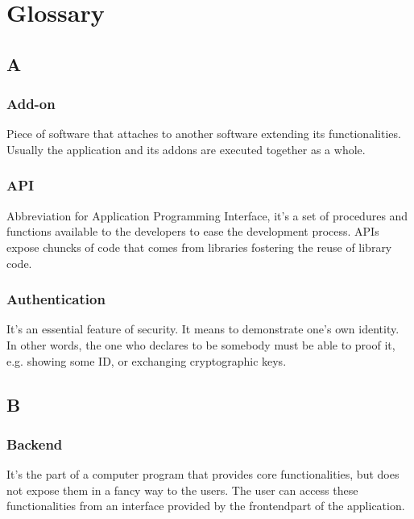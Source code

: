 \section{Glossary}

\subsection*{A}

\subsubsection*{Add-on}
Piece of software that attaches to another software extending its functionalities. Usually the application and its addons are executed together as a whole.

\subsubsection*{API}
Abbreviation for Application Programming Interface, it's a set of procedures and functions available to the developers to ease the development process. APIs expose chuncks of code that comes from libraries fostering the reuse of library code.

\subsubsection*{Authentication}
It's an essential feature of security. It means to demonstrate one's own identity. In other words, the one who declares to be somebody must be able to proof it, e.g. showing some ID, or exchanging cryptographic keys.


\subsection*{B}

\subsubsection*{Backend}
It's the part of a computer program that provides core functionalities, but does not expose them in a fancy way to the users.
The user can access these functionalities from an interface provided by the frontend\glosp part of the application.

